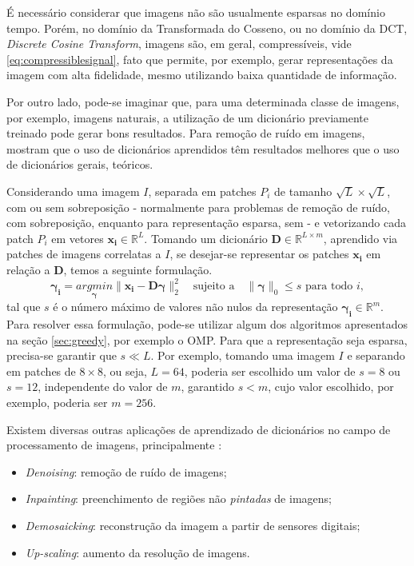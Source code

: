 \documentclass[cic,tc]{iiufrgs}
\renewcommand{\vec}[1]{\bm{#1}}
\newcommand{\mat}[1]{\bm{#1}}
\begin{document}
É necessário considerar que imagens não são usualmente esparsas no domínio tempo.
Porém, no domínio da Transformada do Cosseno, ou no domínio da DCT, \textit{Discrete Cosine Transform}, 
imagens são, em geral, compressíveis, vide \eqref{eq:compressiblesignal}, fato 
que permite, por exemplo, gerar representações da imagem com alta fidelidade, mesmo
utilizando baixa quantidade de informação.

Por outro lado, pode-se imaginar que, para uma determinada classe de imagens,
por exemplo, imagens naturais, a utilização de um dicionário previamente treinado 
pode gerar bons resultados. Para remoção de ruído em imagens, \citet{EladDenoising} 
mostram que o uso de dicionários aprendidos têm resultados melhores que o uso de 
dicionários gerais, teóricos.

Considerando uma imagem $I$, separada em patches $P_i$ de tamanho $\sqrt{L}\times\sqrt{L}$, 
com ou sem sobreposição - normalmente para problemas de remoção de ruído, com sobreposição,
enquanto para representação esparsa, sem - e vetorizando cada patch $P_i$ em vetores
$\vec{x_i} \in \mathbb{R}^L$. Tomando um dicionário $\mat{D} \in \mathbb{R}^{L\times m}$, 
aprendido via patches de imagens correlatas a $I$, se desejar-se representar os patches 
$\vec{x_i}$ em relação a $\mat{D}$, temos a seguinte formulação.
\begin{equation}
    \label{eq:patchcoding}
    \vec{\gamma_i} = \underset{\vec{\gamma}}{argmin} \lVert \vec{x_i} - \mat{D}\vec{\gamma} \rVert_2^2
    \hspace{1em} \text{sujeito a} \hspace{1em}
    \lVert \vec{\gamma} \rVert_0 \le s
    \text{ para todo } i,
\end{equation}
tal que $s$ é o número máximo de valores não nulos da representação $\vec{\gamma_i} \in \mathbb{R}^m$.
Para resolver essa formulação, pode-se utilizar algum dos algoritmos apresentados na
seção \autoref{sec:greedy}, por exemplo o OMP. 
Para que a representação seja esparsa, precisa-se garantir que $s \ll L$.
Por exemplo, tomando uma imagem $I$ e separando em patches de $8\times 8$, ou seja,
$L = 64$, poderia ser escolhido um valor de $s = 8$ ou $s=12$, independente do valor 
de $m$, garantido $s < m$, cujo valor escolhido, por exemplo, poderia ser $m = 256$.

Existem diversas outras aplicações de aprendizado de dicionários no campo de processamento de
imagens, principalmente \cite{MairalSparse}:
\begin{itemize}
    \item \textit{Denoising}: remoção de ruído de imagens;
    \item \textit{Inpainting}: preenchimento de regiões não \textit{pintadas} de imagens;
    \item \textit{Demosaicking}: reconstrução da imagem a partir de sensores digitais;
    \item \textit{Up-scaling}: aumento da resolução de imagens.
\end{itemize}
\end{document}
